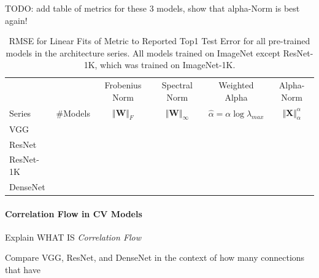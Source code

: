 TODO:  add table of metrics for these 3 models, show that alpha-Norm is best again!

\begin{table}[t]
\small
\begin{center}
\begin{tabular}{|p{1in}|c|c|c|c|c|}
\hline
   &    & Frobenius Norm & Spectral Norm & Weighted Alpha & Alpha-Norm \\
 Series & \#Models   & $\Vert\mathbf{W}\Vert_{F}$ & $\Vert\mathbf{W}\Vert_{\infty}$ & $\hat{\alpha}=\alpha\log\lambda_{max}$ & $\Vert\mathbf{X}\Vert^{\alpha}_{\alpha}$ \\
\hline
 VGG & & & & & \\
 ResNet & & & & & \\
 ResNet-1K & & & & & \\
 DenseNet & & & &  &\\
\hline
\end{tabular}
\end{center}
\caption{RMSE for Linear Fits of Metric to Reported Top1 Test Error for all pre-trained models in the architecture series.  All models trained on ImageNet except ResNet-1K, which was trained on ImageNet-1K. }
\label{table:models}
\end{table}



\paragraph{Correlation Flow in CV Models}

Explain WHAT IS \emph{Correlation Flow}

Compare VGG, ResNet, and DenseNet in the context of how many connections that have


